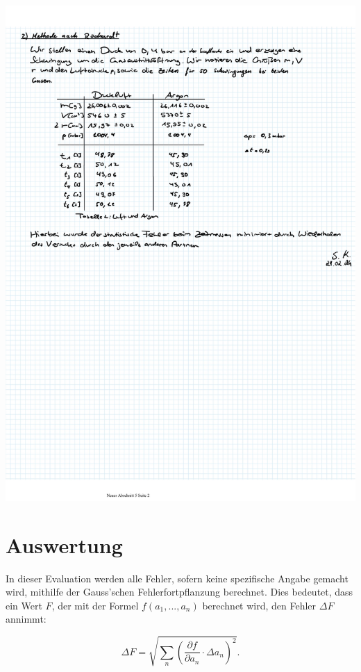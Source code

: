 \documentclass{article}
\begin{document}
\includegraphics[width=\textwidth]{graphics/mess2.jpg}
\newpage

\addtocounter{table}{2}

\newpage
\section{Auswertung}

In dieser Evaluation werden alle Fehler, sofern keine spezifische Angabe gemacht wird, mithilfe der Gauss'schen Fehlerfortpflanzung berechnet. Dies bedeutet, dass ein Wert $F$, der mit der Formel $f(a_1, ..., a_n)$ berechnet wird, den Fehler $\Delta F$ annimmt:

\begin{equation}
    \Delta F = \sqrt{\sum_n \left( \frac{\partial f}{\partial a_n} \cdot \Delta a_n \right)^2}.
\end{equation}
\end{document}
